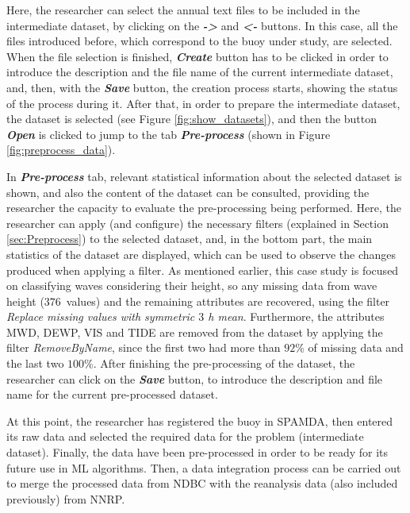 \documentclass[energies,article,accept,moreauthors,pdftex]{Definitions/mdpi}
\begin{document}
\begin{paracol}{2}
			Here, the researcher can select the annual text files to be included in the intermediate dataset, by clicking on the \textbf{\textit{->}} and \textbf{\textit{<-}} buttons. In this case, all the files introduced before, which correspond to the buoy under study, are selected. When the file selection is finished, \textbf{\textit{Create}} button has to be clicked in order to introduce the description and the file name of the current intermediate dataset, and, then, with the \textbf{\textit{Save}} button, the creation process starts, showing the status of the process during it. After that, in order to prepare the intermediate dataset, the dataset is selected (see Figure \ref{fig:show_datasets}), and then the button \textbf{\textit{Open}} is clicked to jump to the tab \textbf{\textit{Pre-process}} (shown in Figure \ref{fig:preprocess_data}).
			
			In \textbf{\textit{Pre-process}} tab, relevant statistical information about the selected dataset is shown, and also the content of the dataset can be consulted, providing the researcher the capacity to evaluate the pre-processing being performed. Here, the researcher can apply (and configure) the necessary filters (explained in Section \ref{sec:Preprocess}) to the selected dataset, and, in the bottom part, the main statistics of the dataset are displayed, which can be used to observe the changes produced when applying a filter. As mentioned earlier, this case study is focused on classifying waves considering their height, so any missing data from wave height ($376$~values) and the remaining attributes are recovered, using the filter \textit{Replace missing values with symmetric $3$ h mean}. Furthermore, the attributes MWD, DEWP, VIS and TIDE are removed from the dataset by applying the filter \textit{RemoveByName}, since the first two had more than $92$\% of missing data and the last two $100$\%. After finishing the pre-processing of the dataset, the researcher can click on the \textbf{\textit{Save}} button, to introduce the description and file name for the current pre-processed dataset.
			
			At this point, the researcher has registered the buoy in SPAMDA, then entered its raw data and selected the required data for the problem (intermediate dataset). Finally, the data have been pre-processed in order to be ready for its future use in ML algorithms. Then, a data integration process can be carried out to merge the processed data from NDBC with the reanalysis data (also included previously) from NNRP.
			
			
\end{paracol}
\end{document}
